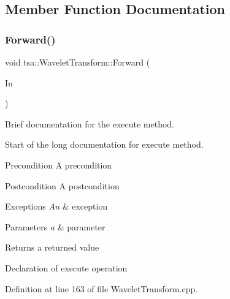 \subsection{Member Function Documentation}
\mbox{\label{classtsa_1_1_wavelet_transform_afb63ce4986e8e123c7a35f5a39bb7600}} 
\subsubsection{\texorpdfstring{Forward()}{Forward()}\hspace{0.1cm}{\footnotesize\ttfamily [1/2]}}
{\footnotesize\ttfamily void tsa\+::\+Wavelet\+Transform\+::\+Forward (\begin{DoxyParamCaption}\item[{\hyperlink{namespacetsa_ac599574bcc094eda25613724b8f3ca9e}{Seq\+View\+Double} \&}]{In }\end{DoxyParamCaption})}



Brief documentation for the execute method. 

Start of the long documentation for execute method.

\begin{DoxyPrecond}{Precondition}
A precondition 
\end{DoxyPrecond}
\begin{DoxyPostcond}{Postcondition}
A postcondition 
\end{DoxyPostcond}

\begin{DoxyExceptions}{Exceptions}
{\em An} & exception\\
\hline
\end{DoxyExceptions}

\begin{DoxyParams}{Parameters}
{\em a} & parameter\\
\hline
\end{DoxyParams}
\begin{DoxyReturn}{Returns}
a returned value
\end{DoxyReturn}
Declaration of execute operation 

Definition at line 163 of file Wavelet\+Transform.\+cpp.

\mbox{\label{classtsa_1_1_wavelet_transform_a058f02f4ff2348d1899fda867badc71f}} 
